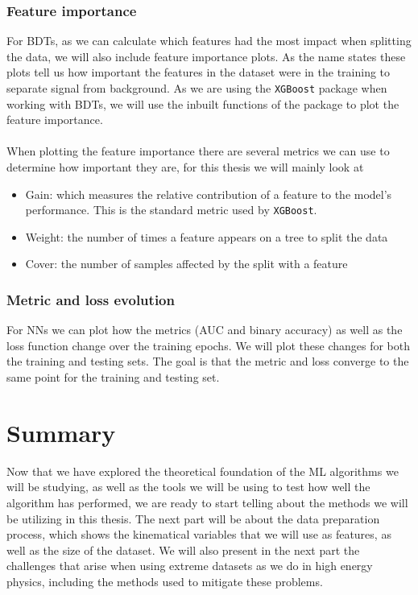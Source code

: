 \documentclass[12pt, a4paper]{book}
\begin{document}
\subsubsection{Feature importance}
For BDTs, as we can calculate which features had the most impact when splitting the data, we will also include feature importance plots. As the name states these plots tell us how important the features in the dataset were in the training to separate signal from background. As we are using the \verb|XGBoost| 
package when working with BDTs, we will use the inbuilt functions of the package to plot the feature importance. \\
\\When plotting the feature importance there are several metrics we can use to determine how important they are, for this thesis we will mainly look at 
\begin{itemize}
    \item Gain: which measures the relative contribution of a feature to the model's performance. This is the standard metric used by \verb|XGBoost|.
    \item Weight: the number of times a feature appears on a tree to split the data
    \item Cover: the number of samples affected by the split with a feature
\end{itemize}

\subsubsection{Metric and loss evolution}
For NNs we can plot how the metrics (AUC and binary accuracy) as well as the loss function change over the training epochs. We will plot these changes for both the training and testing sets. The goal is that the metric and loss converge to the same point for the training and testing set.
\newpage
\section{Summary}
Now that we have explored the theoretical foundation of the ML algorithms we will be studying, as well as the tools we will be using to test how well the algorithm has performed, we are ready to start telling about the methods we will be utilizing in this thesis. The next part will be about the data preparation process, 
which shows the kinematical variables that we will use as features, as well as the size of the dataset. We will also present in the next part the challenges that arise when using extreme datasets as we do in high energy physics, including the methods used to mitigate these problems. 
\end{document}
